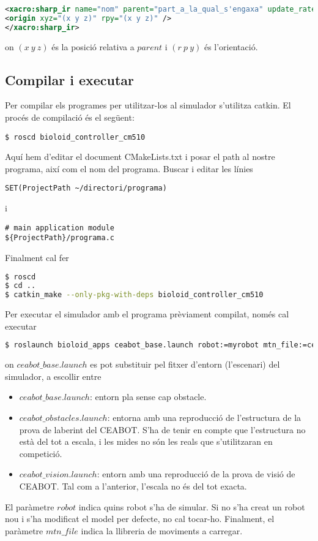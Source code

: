 \documentclass{article}
\begin{document}
\begin{lstlisting}[language=xml]
<xacro:sharp_ir name="nom" parent="part_a_la_qual_s'engaxa" update_rate="20" fov="0.05" min_range="0.1" max_range="0.8">
<origin xyz="(x y z)" rpy="(x y z)" />
</xacro:sharp_ir>
\end{lstlisting}
on $(x\ y\ z)$ és la posició relativa a $parent$ i $(r\ p\ y)$ és l'orientació. 

\subsection{Compilar i executar}
Per compilar els programes per utilitzar-los al simulador s'utilitza catkin. El procés de compilació és el següent:
\begin{lstlisting}
$ roscd bioloid_controller_cm510
\end{lstlisting}
Aquí hem d'editar el document CMakeLists.txt i posar el path al nostre programa, així com el nom del programa. Buscar i editar les línies

\begin{lstlisting}
SET(ProjectPath ~/directori/programa)
\end{lstlisting} 
i
\begin{lstlisting}
# main application module
${ProjectPath}/programa.c
\end{lstlisting}
Finalment cal fer
\begin{lstlisting}[language=bash]
$ roscd
$ cd ..
$ catkin_make --only-pkg-with-deps bioloid_controller_cm510
\end{lstlisting}

Per executar el simulador amb el programa prèviament compilat, només cal executar
\begin{lstlisting}[language=bash]
$ roslaunch bioloid_apps ceabot_base.launch robot:=myrobot mtn_file:=ceabot_motions
\end{lstlisting}
on $ceabot\_base.launch$ es pot substituir pel fitxer d'entorn (l'escenari) del simulador, a escollir entre
\begin{itemize}
	\item $ceabot\_base.launch$: entorn pla sense cap obstacle.
	\item $ceabot\_obstacles.launch$: entorna amb una reproducció de l'estructura de la prova de laberint del CEABOT. S'ha de tenir en compte que l'estructura no està del tot a escala, i les mides no són les reals que s'utilitzaran en competició.
	\item $ceabot\_vision.launch$: entorn amb una reproducció de la prova de visió de CEABOT. Tal com a l'anterior, l'escala no és del tot exacta.
\end{itemize}
El paràmetre $robot$ indica quins robot s'ha de simular. Si no s'ha creat un robot nou i s'ha modificat el model per defecte, no cal tocar-ho. Finalment, el paràmetre $mtn\_file$ indica la llibreria de moviments a carregar.
\end{document}
